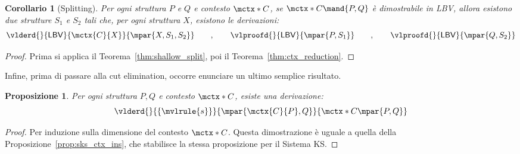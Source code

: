 \documentclass[12pt,a4paper,openright,twoside]{report}
\newtheorem{cor}[thm]{Corollario}
\newtheorem{prop}[thm]{Proposizione}
\begin{document}
\begin{cor}[Splitting]\label{cor:splitting}
Per ogni struttura $P$ e $Q$ e contesto $\mctx*{C}$, se $\mctx*{C}\mand{P,Q}$ \`e dimostrabile in \textsf{LBV}, allora esistono due strutture $S_1$ e $S_2$ tali che, per ogni struttura $X$, esistono le derivazioni:
$$
	\vlderd{}{\mathsf{LBV}}{\mctx{C}{X}}{\mpar{X,S_1,S_2}}
	\qquad,\qquad
	\vlproofd{}{\mathsf{LBV}}{\mpar{P, S_1}}
	\qquad,\qquad
	\vlproofd{}{\mathsf{LBV}}{\mpar{Q, S_2}}
$$
\end{cor}
\begin{proof}
Prima si applica il Teorema~\ref{thm:shallow_split}, poi il Teorema~\ref{thm:ctx_reduction}.
\end{proof}

Infine, prima di passare alla cut elimination, occorre enunciare un ultimo semplice risultato.

\begin{prop}\label{prop:lbv_ctx_ins}
Per ogni struttura $P, Q$ e contesto $\mctx*{C}$, esiste una derivazione:
$$
	\vlderd{}{\{\mvlrule{s}\}}{\mpar{\mctx{C}{P}, Q}}{\mctx*{C}\mpar{P, Q}}
$$
\end{prop}
\begin{proof}
Per induzione sulla dimensione del contesto $\mctx*{C}$. Questa dimostrazione \`e uguale a quella della Proposizione~\ref{prop:sks_ctx_ins}, che stabilisce la stessa proposizione per il Sistema \textsf{KS}.
\end{proof}
\end{document}
